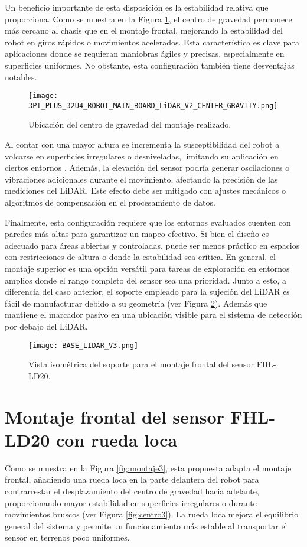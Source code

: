 Un beneficio importante de esta disposición es la estabilidad relativa que proporciona. Como se muestra en la Figura \ref{fig:centro2}, el centro de gravedad permanece más cercano al chasis que en el montaje frontal, mejorando la estabilidad del robot en giros rápidos o movimientos acelerados. Esta característica es clave para aplicaciones donde se requieran maniobras ágiles y precisas, especialmente en superficies uniformes. No obstante, esta configuración también tiene desventajas notables. 

\begin{figure}[H]
	\centering
	\texttt{[image: 3PI\_PLUS\_32U4\_ROBOT\_MAIN\_BOARD\_LiDAR\_V2\_CENTER\_GRAVITY.png]}
	\caption{Ubicación del centro de gravedad del montaje realizado.}
	\label{fig:centro2}
\end{figure}

Al contar con una mayor altura se incrementa la susceptibilidad del robot a volcarse en superficies irregulares o desniveladas, limitando su aplicación en ciertos entornos \cite{lidar_height}. Además, la elevación del sensor podría generar oscilaciones o vibraciones adicionales durante el movimiento, afectando la precisión de las mediciones del LiDAR. Este efecto debe ser mitigado con ajustes mecánicos o algoritmos de compensación en el procesamiento de datos.

Finalmente, esta configuración requiere que los entornos evaluados cuenten con paredes más altas para garantizar un mapeo efectivo. Si bien el diseño es adecuado para áreas abiertas y controladas, puede ser menos práctico en espacios con restricciones de altura o donde la estabilidad sea crítica. En general, el montaje superior es una opción versátil para tareas de exploración en entornos amplios donde el rango completo del sensor sea una prioridad. Junto a esto, a diferencia del caso anterior, el soporte empleado para la sujeción del LiDAR es fácil de manufacturar debido a su geometría (ver Figura \ref{fig:base2}). Además que mantiene el marcador pasivo en una ubicación visible para el sistema de detección por debajo del LiDAR.

\begin{figure}[H]
	\centering
	\texttt{[image: BASE\_LIDAR\_V3.png]}
	\caption{Vista isométrica del soporte para el montaje frontal del sensor FHL-LD20.}
	\label{fig:base2}
\end{figure}

\section{Montaje frontal del sensor FHL-LD20 con rueda loca}
Como se muestra en la Figura \ref{fig:montaje3}, esta propuesta adapta el montaje frontal, añadiendo una rueda loca en la parte delantera del robot para contrarrestar el desplazamiento del centro de gravedad hacia adelante, proporcionando mayor estabilidad en superficies irregulares o durante movimientos bruscos (ver Figura \ref{fig:centro3}). La rueda loca mejora el equilibrio general del sistema y permite un funcionamiento más estable al transportar el sensor en terrenos poco uniformes.

